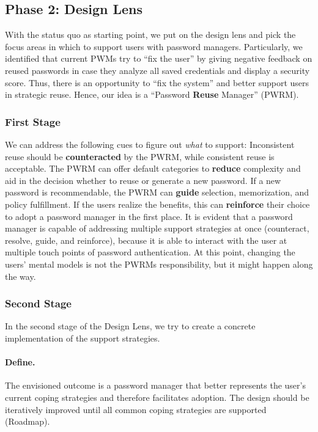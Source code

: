 \subsection{Phase 2: Design Lens}
With the status quo as starting point, we put on the design lens and pick the focus areas in which to support users with password managers. Particularly, we identified that current PWMs try to ``fix the user'' by giving negative feedback on reused passwords in case they analyze all saved credentials and display a security score. Thus, there is an opportunity to ``fix the system'' and better support users in strategic reuse. Hence, our idea is a ``Password \textbf{Reuse} Manager'' (PWRM). 

\subsubsection{First Stage}
We can address the following cues to figure out \textit{what} to support: Inconsistent reuse should be \textbf{counteracted} by the PWRM, while consistent reuse is acceptable. The PWRM can offer default categories to \textbf{reduce} complexity and aid in the decision whether to reuse or generate a new password. If a new password is recommendable, the PWRM can \textbf{guide} selection, memorization, and policy fulfillment. If the users realize the benefits, this can \textbf{reinforce} their choice to adopt a password manager in the first place. It is evident that a password manager is capable of addressing multiple support strategies at once (counteract, resolve, guide, and reinforce), because it is able to interact with the user at multiple touch points of password authentication. At this point, changing the users' mental models is not the PWRMs responsibility, but it might happen along the way. 

\subsubsection{Second Stage}
In the second stage of the Design Lens, we try to create a concrete implementation of the support strategies. 
\paragraph{Define.} The envisioned outcome is a password manager that better represents the user's current coping strategies and therefore facilitates adoption. The design should be iteratively improved until all common coping strategies are supported (Roadmap). 

